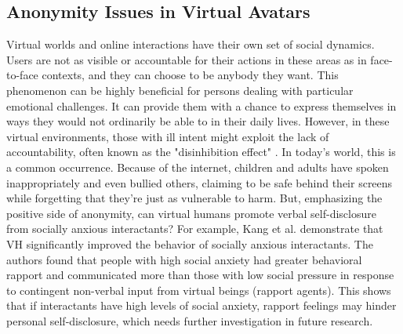 \subsection{Anonymity Issues in Virtual Avatars}
Virtual worlds and online interactions have their own set of social dynamics. Users are not as visible or accountable for their actions in these areas as in face-to-face contexts, and they can choose to be anybody they want. This phenomenon can be highly beneficial for persons dealing with particular emotional challenges. It can provide them with a chance to express themselves in ways they would not ordinarily be able to in their daily lives. However, in these virtual environments, those with ill intent might exploit the lack of accountability, often known as the "disinhibition effect" \cite{WAN20, KUR18}. In today's world, this is a common occurrence. Because of the internet, children and adults have spoken inappropriately and even bullied others, claiming to be safe behind their screens while forgetting that they're just as vulnerable to harm. But, emphasizing the positive side of anonymity, can virtual humans promote verbal self-disclosure from socially anxious interactants? For example, Kang et al. \cite{KAN10} demonstrate that VH significantly improved the behavior of socially anxious interactants. The authors found that people with high social anxiety had greater behavioral rapport and communicated more than those with low social pressure in response to contingent non-verbal input from virtual beings (rapport agents). This shows that if interactants have high levels of social anxiety, rapport feelings may hinder personal self-disclosure, which needs further investigation in future research.

